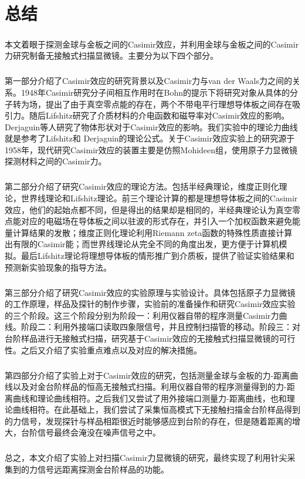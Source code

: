 \chapter{总结}
\paragraph*{}
本文着眼于探测金球与金板之间的Casimir效应，并利用金球与金板之间的Casimir力研究制备无接触式扫描显微镜。主要分为以下四个部分。
\paragraph*{}
第一部分介绍了Casimir效应的研究背景以及Casimir力与van der Waals力之间的关系。1948年Casimir研究分子间相互作用时在Bohn的提示下将研究对象从具体的分子转为场，提出了由于真空零点能的存在，两个不带电平行理想导体板之间存在吸引力。随后Lifshitz研究了介质材料的介电函数和磁导率对Casimir效应的影响。Derjaguin等人研究了物体形状对于Casimir效应的影响。我们实验中的理论力曲线就是参考了Lifshitz和
Derjaguin的理论公式。关于Casimir效应实验上的研究源于1958年，现代研究Casimir效应的装置主要是仿照Mohideen组，使用原子力显微镜探测材料之间的Casimir力。
\paragraph*{}
第二部分介绍了研究Casimir效应的理论方法。包括半经典理论，维度正则化理论，世界线理论和Lifshitz理论。前三个理论计算的都是理想导体板之间的Casimir效应，他们的起始点都不同，但是得出的结果却是相同的，半经典理论认为真空零点能对应的电磁场在导体板之间以驻波的形式存在，并引入一个加权函数来避免能量计算结果的发散；维度正则化理论利用Riemann zeta函数的特殊性质直接计算出有限的Casimir能；而世界线理论从完全不同的角度出发，更方便于计算机模拟。最后Lifshitz理论将理想导体板的情形推广到介质板，提供了验证实验结果和预测新实验现象的指导方法。
\paragraph*{}
第三部分介绍了研究Casimir效应的实验原理与实验设计。具体包括原子力显微镜的工作原理，样品及探针的制作步骤，实验前的准备操作和研究Casimir效应实验的三个阶段。这三个阶段分别为阶段一：利用仪器自带的程序测量Casimir力曲线。阶段二：利用外接端口读取四象限信号，并且控制扫描管的移动。阶段三：对台阶样品进行无接触式扫描，研究基于Casimir效应的无接触式扫描显微镜的可行性。之后又介绍了实验重点难点以及对应的解决措施。
\paragraph*{}
第四部分介绍了实验上对于Casimir效应的研究，包括测量金球与金板的力-距离曲线以及对金台阶样品的恒高无接触式扫描。利用仪器自带的程序测量得到的力-距离曲线和理论曲线相符。之后我们又尝试了用外接端口测量力-距离曲线，也和理论曲线相符。在此基础上，我们尝试了采集恒高模式下无接触扫描金台阶样品得到的力信号，发现探针与样品相距很近时能够感应到台阶的存在，但是随着距离的增大，台阶信号最终会淹没在噪声信号之中。
\paragraph*{}
总之，本文介绍了实验上对扫描Casimir力显微镜的研究，最终实现了利用针尖采集到的力信号远距离探测金台阶样品的功能。